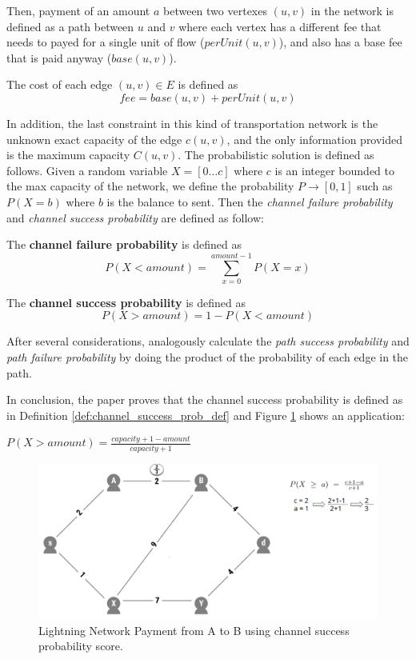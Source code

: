 Then, payment of an amount $a$ between two vertexes $(u, v)$ in the network is defined 
as a path between $u$ and $v$ where each vertex has a different fee that needs to payed for a 
single unit of flow ($perUnit(u, v)$), and also has a base fee that is paid anyway ($base(u, v)$).

\begin{definition}
    The cost of each edge $(u, v) \in E$ is defined as 
    $$fee = base(u, v) + perUnit(u, v)$$
\end{definition}

In addition, the last constraint in this kind of transportation network is the 
unknown exact capacity of the edge $c(u, v)$, and the only information provided 
is the maximum capacity $C(u, v)$.
The probabilistic solution is defined as follows.  Given  a random variable $X = [0 \dots c]$ where $c$ is an integer bounded to the max capacity of the network, we define the probability 
$P \rightarrow [0, 1]$ such as $P(X = b)$ where $b$ is the balance to sent.
Then the \emph{channel failure probability} and \emph{channel success probability} are defined as follow:

\begin{definition}
   The {\bf channel failure probability} is defined as $$P(X < amount) = \sum_{x = 0}^{amount - 1} P(X = x)$$ 
\end{definition}

\begin{definition}
    The {\bf channel success probability} is defined as $$P(X > amount) = 1 -  P(X < amount)$$
\end{definition}

After several considerations, analogously calculate the \emph{path success probability} and
\emph{path failure probability} by doing the product of the probability of each edge in the path.

In conclusion, the paper proves that the channel success probability is defined as in 
Definition \ref{def:channel_success_prob_def} and  Figure \ref{fig:channel_success_prob_score}
shows an application: 

\begin{definition}
\label{def:channel_success_prob_def}
    $P(X > amount) = \frac{capacity + 1 - amount}{capacity + 1}$
\end{definition}


\begin{figure}[h]
  \begin{center}
  \includegraphics[width=0.6\columnwidth]{imgs/mincost_rene1.png}
  \end{center}
  \caption{Lightning Network Payment from A to B using channel success probability score.} 
  \label{fig:channel_success_prob_score}
\end{figure}


